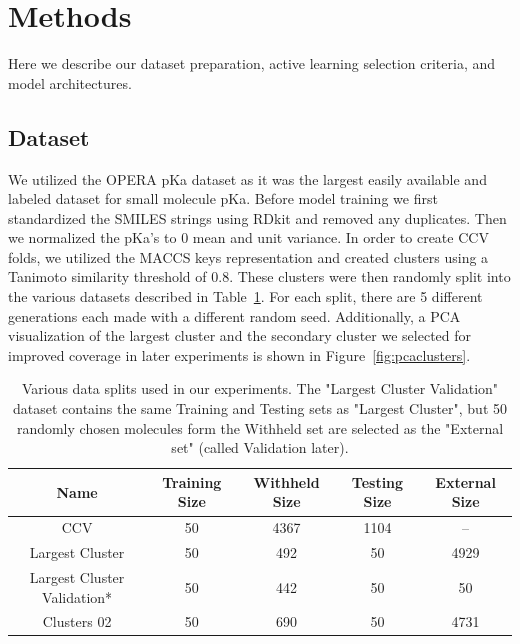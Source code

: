\documentclass[journal=jmcmar,manuscript=article]{achemso}
\begin{document}
\section{Methods}
Here we describe our dataset preparation, active learning selection criteria, and model architectures.

\subsection{Dataset}
We utilized the OPERA pKa dataset\cite{operapKa} as it was the largest easily available and labeled dataset for small molecule pKa. Before model training we first standardized the SMILES\cite{smiles} strings using RDkit\cite{rdkit} and removed any duplicates. Then we normalized the pKa's to 0 mean and unit variance. In order to create CCV folds, we utilized the MACCS keys \cite{maccskeys} representation and created clusters using a Tanimoto similarity threshold of 0.8. These clusters were then randomly split into the various datasets described in Table~\ref{tab:datasets}. For each split, there are 5 different generations each made with a different random seed. Additionally, a PCA visualization of the largest cluster and the secondary cluster we selected for improved coverage in later experiments is shown in Figure~\ref{fig:pcaclusters}.

\begin{table}[]
    \centering
    \begin{tabular}{c|c|c|c|c}
    \hline
        Name & Training Size & Withheld Size & Testing Size & External Size \\
    \hline
        CCV & 50 & 4367 & 1104 & -- \\
        Largest Cluster & 50 & 492 & 50 & 4929 \\
        Largest Cluster Validation* & 50 & 442 & 50 & 50 \\
        Clusters 02 & 50 & 690 & 50 & 4731 \\
    \hline
    \end{tabular}
    \caption{Various data splits used in our experiments. The "Largest Cluster Validation" dataset contains the same Training and Testing sets as "Largest Cluster", but 50 randomly chosen molecules form the Withheld set are selected as the "External set" (called Validation later).}
    \label{tab:datasets}
\end{table}
\end{document}
